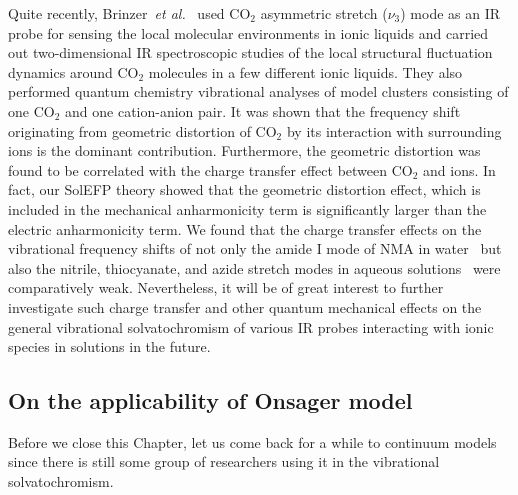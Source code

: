 \documentclass[a4paper,titlepage,twoside,fleqn,12pt]{book}
\begin{document}
\begin{refsection}
Quite recently, 
Brinzer~\emph{et al.}~\citep{Brinzer.Berquist.Zhe.Dutta.Johnson.Krisher.Lambrecht.Garrett-Roe.JCP.2015} 
used CO$_2$ asymmetric
stretch ($\nu_3$) mode as an IR probe for sensing the local molecular
environments in ionic liquids and carried out two\hyp{}dimensional
IR spectroscopic studies of the local structural fluctuation dynamics
around CO$_2$ molecules in a few different ionic liquids.
They also performed quantum chemistry vibrational analyses
of model clusters consisting of one CO$_2$ and one cation-anion
pair. It was shown that the frequency shift originating from
geometric distortion of CO$_2$ by its interaction with surrounding
ions is the dominant contribution. Furthermore, the geometric
distortion was found to be correlated with the charge transfer
effect between CO$_2$ and ions. In fact, our SolEFP theory
showed that the geometric distortion effect, which is included
in the mechanical anharmonicity term
is significantly larger than the electric anharmonicity term.
We found that the charge transfer effects on the vibrational
frequency shifts of not only the amide I mode of NMA
in water~\citep{Blasiak.Cho.JCP.2014} but also the nitrile, thiocyanate, and
azide stretch modes in aqueous solutions~\citep{Lee.Choi.Cho.PCCP.2010} 
were comparatively
weak. Nevertheless, it will be of great interest to further
investigate such charge transfer and other quantum mechanical
effects on the general vibrational solvatochromism of various
IR probes interacting with ionic species in solutions in the
future.

\subsection{On the applicability of Onsager model}

Before we close this Chapter, let us come back for a while to
continuum models since there is still some group of researchers
using it in the vibrational solvatochromism. 


\end{refsection}
\end{document}
